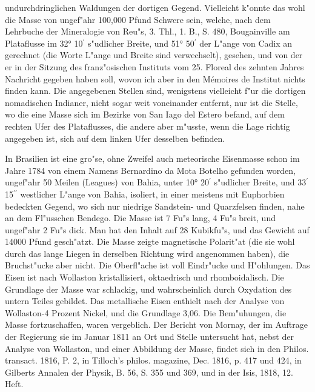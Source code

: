 \documentclass[a4paper, 11pt, oneside, polutonikogreek, german]{article}
\begin{document}
undurchdringlichen Waldungen der dortigen Gegend. Vielleicht k"onnte das wohl die Masse von ungef"ahr 100,000 Pfund Schwere sein, welche, nach dem Lehrbuche der Mineralogie von Reu"s, 3. Thl., 1. B., S. 480, Bougainville am Plataflusse im 32° 10$^{\prime}$ s"udlicher Breite, und 51° 50$^{\prime}$ der L"ange von Cadix an gerechnet (die Worte L"ange und Breite sind verwechselt), gesehen, und von der er in der Sitzung des franz"osischen Instituts vom 25. Floreal des zehnten Jahres Nachricht gegeben haben soll, wovon ich aber in den Mémoires de Institut nichts finden kann. Die angegebenen Stellen sind, wenigstens vielleicht f"ur die dortigen nomadischen Indianer, nicht sogar weit voneinander entfernt, nur ist die Stelle, wo die eine Masse sich im Bezirke von San Iago del Estero befand, auf dem rechten Ufer des Plataflusses, die andere aber m"usste, wenn die Lage richtig angegeben ist, sich auf dem linken Ufer desselben befinden.

In Brasilien ist eine gro"se, ohne Zweifel auch meteorische Eisenmasse schon im Jahre 1784 von einem Namens Bernardino da Mota Botelho gefunden worden, ungef"ahr 50 Meilen (Leagues) von Bahia, unter 10° 20$^{\prime}$ s"udlicher Breite, und 33$^{\prime}$ 15$^{\prime\prime}$ westlicher L"ange von Bahia, isoliert, in einer meistens mit Euphorbien bedeckten Gegend, wo sich nur niedrige Sandstein- und Quarzfelsen finden, nahe an dem Fl"usschen Bendego. Die Masse ist 7 Fu"s lang, 4 Fu"s breit, und ungef"ahr 2 Fu"s dick. Man hat den Inhalt auf 28 Kubikfu"s, und das Gewicht auf 14000 Pfund gesch"atzt. Die Masse zeigte magnetische Polarit"at (die sie wohl durch das lange Liegen in derselben Richtung wird angenommen haben), die Bruchst"ucke aber nicht. Die Oberfl"ache ist voll Eindr"ucke und H"ohlungen. Das Eisen ist nach Wollaston kristallisiert, oktaedrisch und rhomboidalisch. Die Grundlage der Masse war schlackig, und wahrscheinlich durch Oxydation des untern Teiles gebildet. Das metallische Eisen enthielt nach der Analyse von Wollaston-4 Prozent Nickel, und die Grundlage 3,06. Die Bem"uhungen, die Masse fortzuschaffen, waren vergeblich. Der Bericht von Mornay, der im Auftrage der Regierung sie im Januar 1811 an Ort und Stelle untersucht hat, nebst der Analyse von Wollaston, und einer Abbildung der Masse, findet sich in den Philos. transact. 1816, P. 2, in Tilloch's philos. magazine, Dec. 1816, p. 417 und 424, in Gilberts Annalen der Physik, B. 56, S. 355 und 369, und in der Isis, 1818, 12. Heft.
\end{document}
